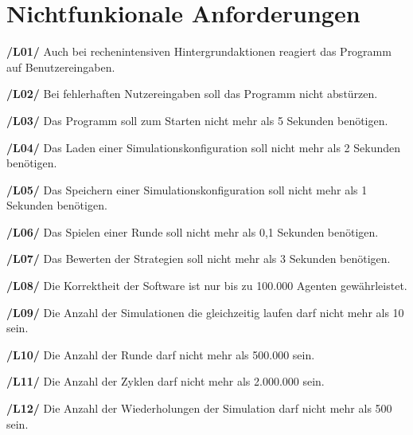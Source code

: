 \section{Nichtfunkionale Anforderungen}

\textbf{/L01/ }
Auch bei rechenintensiven Hintergrundaktionen reagiert das Programm auf Benutzereingaben.

\textbf{/L02/}
Bei fehlerhaften Nutzereingaben soll das Programm nicht abstürzen.

\textbf{/L03/}
Das Programm soll zum Starten nicht mehr als 5 Sekunden benötigen.

\textbf{/L04/}
Das Laden einer Simulationskonfiguration soll nicht mehr als 2 Sekunden benötigen.

\textbf{/L05/}
Das Speichern einer Simulationskonfiguration soll nicht mehr als 1 Sekunden benötigen.

\textbf{/L06/}
Das Spielen einer Runde soll nicht mehr als 0,1 Sekunden benötigen.

\textbf{/L07/}
Das Bewerten der Strategien soll nicht mehr als 3 Sekunden benötigen.

\textbf{/L08/}
Die Korrektheit der Software ist nur bis zu 100.000 Agenten gewährleistet.

\textbf{/L09/}
Die Anzahl der Simulationen die gleichzeitig laufen darf nicht mehr als 10 sein.

\textbf{/L10/}
Die Anzahl der Runde darf nicht mehr als 500.000 sein.

\textbf{/L11/}
Die Anzahl der Zyklen darf nicht mehr als 2.000.000 sein.

\textbf{/L12/}
Die Anzahl der Wiederholungen der Simulation darf nicht mehr als 500 sein.